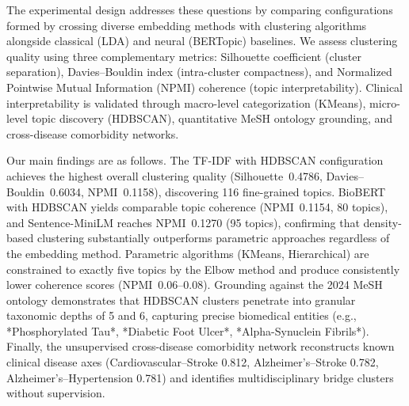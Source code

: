 \documentclass[a4paper,fleqn]{cas-dc}
\begin{document}
The experimental design addresses these questions by comparing configurations formed by crossing diverse embedding methods with clustering algorithms alongside classical (LDA) and neural (BERTopic) baselines. We assess clustering quality using three complementary metrics: Silhouette coefficient (cluster separation), Davies--Bouldin index (intra-cluster compactness), and Normalized Pointwise Mutual Information (NPMI) coherence (topic interpretability). Clinical interpretability is validated through macro-level categorization (KMeans), micro-level topic discovery (HDBSCAN), quantitative MeSH ontology grounding, and cross-disease comorbidity networks.

Our main findings are as follows. The TF-IDF with HDBSCAN configuration achieves the highest overall clustering quality (Silhouette~0.4786, Davies--Bouldin~0.6034, NPMI~0.1158), discovering 116 fine-grained topics. BioBERT with HDBSCAN yields comparable topic coherence (NPMI~0.1154, 80 topics), and Sentence-MiniLM reaches NPMI~0.1270 (95 topics), confirming that density-based clustering substantially outperforms parametric approaches regardless of the embedding method. Parametric algorithms (KMeans, Hierarchical) are constrained to exactly five topics by the Elbow method and produce consistently lower coherence scores (NPMI~0.06--0.08). Grounding against the 2024 MeSH ontology demonstrates that HDBSCAN clusters penetrate into granular taxonomic depths of 5 and 6, capturing precise biomedical entities (e.g., *Phosphorylated Tau*, *Diabetic Foot Ulcer*, *Alpha-Synuclein Fibrils*). Finally, the unsupervised cross-disease comorbidity network reconstructs known clinical disease axes (Cardiovascular--Stroke 0.812, Alzheimer's--Stroke 0.782, Alzheimer's--Hypertension 0.781) and identifies multidisciplinary bridge clusters without supervision.
\end{document}
